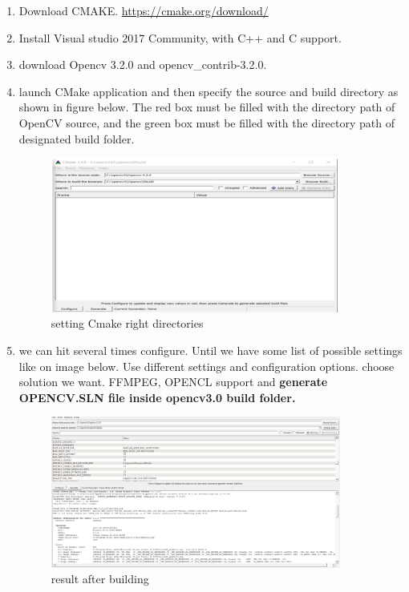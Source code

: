 \begin{enumerate}
\item Download CMAKE.
 \url{https://cmake.org/download/}
\item Install Visual studio 2017 Community, with C++ and C support.
\item download Opencv 3.2.0 and opencv\_contrib-3.2.0.
\item launch CMake application and then specify the source and build directory as shown in figure below. The red box must be filled with the directory path of OpenCV source, and the green box must be filled with the directory path of designated build folder.

\begin{figure}[H]
\centering
\includegraphics[width=0.9\textwidth]{img/working1.png}
\caption{ setting Cmake right directories }
\label{fig:working1}
\end{figure}

\item we can hit several times  configure. Until we have some list of possible settings like on image below. Use different settings and configuration options. choose  solution we want. FFMPEG, OPENCL support and \textbf{generate OPENCV.SLN file inside  opencv3.0 build folder.} 

\begin{figure}[H]
\centering
\includegraphics[width=0.9\textwidth]{img/working2.png}
\caption{ result after building }
\label{fig:working2}
\end{figure}


\end{enumerate}
